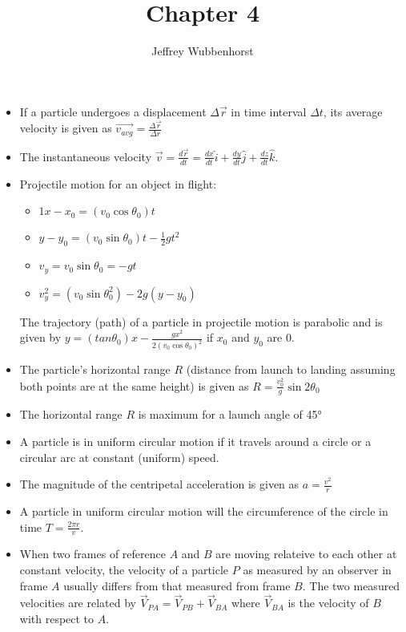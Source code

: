 \documentclass[10pt,letterpaper]{article}
\author{Jeffrey Wubbenhorst}
\title{Chapter 4}
\begin{document}
\maketitle

\begin{itemize}
\item If a particle undergoes a displacement $\Delta \vec{r}$ in time interval $\Delta t$, its average velocity is given as $\vec{v_{avg}}=\frac{\Delta \vec{r}}{\Delta r}$ 


\item The instantaneous velocity $\vec{v}=\frac{d\vec{r}}{dt}=\frac{dx}{dt}\hat{i}+\frac{dy}{dt}\hat{j}+\frac{dz}{dt}\hat{k}$. 


\item Projectile motion for an object in flight: 
\begin{itemize}
\item $1x-x_0=(v_0\cos \theta_0)t$ \\ 
\item $ y-y_0=(v_0\sin \theta_0)t-\frac{1}{2}gt^2$ \\ 
\item $v_y=v_0\sin \theta_0=-gt$ \\ 
\item $v_y^2=(v_0\sin \theta_0 ^2)-2g(y-y_0)$ \\ 
\end{itemize}

The trajectory (path) of a particle in projectile motion is parabolic and is given by 
$y=(tan\theta_0)x-\frac{gx^2}{2(v_0\cos \theta_0)^2}$
if $x_0$ and $y_0$ are 0. 

\item The particle's horizontal range $R$ (distance from launch to landing assuming both points are at the same height) is given as $R=\frac{v_0^2}{g}\sin 2\theta_0$

\item The horizontal range $R$ is maximum for a launch angle of \ang{45}


\item A particle is in uniform circular motion if it travels around a circle or a circular arc at constant (uniform) speed. 

\item The magnitude of the centripetal acceleration is given as $a=\frac{v^2}{r}$ 
\item A particle in uniform circular motion will the circumference of the circle in time $T=\frac{2\pi r}{v}$. 


\item When two frames of reference $A$ and $B$ are moving relateive to each other at constant velocity, the velocity of a particle $P$ as measured by an observer in frame $A$ usually differs from that measured from frame $B$. The two measured velocities are related by $\vec{V}_{PA}=\vec{V}_{PB}+\vec{V}_{BA}$ where $\vec{V}_{BA}$ is the velocity of $B$ with respect to $A$. 



\end{itemize}
\end{document}
